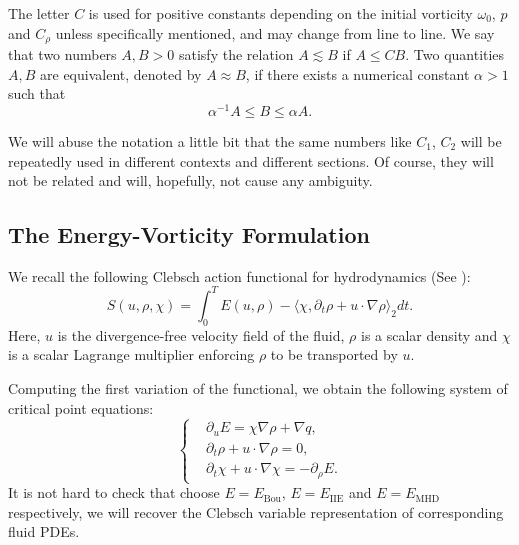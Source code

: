 \documentclass[12pt,letterpaper]{article}
\theoremstyle{plain}
\begin{document}
The letter $C$ is used for positive constants depending on the initial vorticity $\omega_0$, $p$ and $C_\rho$ unless specifically mentioned, and may change from line to line. We say that two numbers $A,B>0$ satisfy the relation $A\lesssim B$ if $A\le CB$. Two quantities $A,B$ are equivalent, denoted by $A\approx B$, if there exists a numerical constant $\alpha>1$ such that
\begin{equation*}
 \alpha^{-1}A\le B\le \alpha A.  
\end{equation*}

We will abuse the notation a little bit that the same numbers like $C_1$, $C_2$ will be repeatedly used in different contexts and different sections. Of course, they will not be related and will, hopefully, not cause any ambiguity.


\subsection{The Energy-Vorticity Formulation}


We recall the following Clebsch action functional for hydrodynamics (See \cite{HMR98}\cite{HSS09}):
\begin{equation*}
S(u,\rho,\chi)=\int_0^T E(u,\rho)-\langle \chi,\partial_t\rho+u\cdot\nabla\rho\rangle_2 dt  .  \end{equation*}
Here, $u$ is the divergence-free velocity field of the fluid, $\rho$ is a scalar density and $\chi$ is a scalar Lagrange multiplier enforcing $\rho$ to be transported by $u$.

Computing the first variation of the functional, we obtain the following system of critical point equations:
\begin{equation}\label{Critical Point of Clebsch}
\left\{
\begin{aligned}
&\partial_u E=\chi\nabla\rho+\nabla q,\\
&\partial_t \rho+u\cdot\nabla\rho=0,\\
& \partial_t \chi+u\cdot\nabla\chi=-\partial_\rho E.
\end{aligned}
\right.
\end{equation}
It is not hard to check that choose $E=E_{\text{Bou}}$, $E=E_{\text{IIE}}$ and $E=E_{\text{MHD}}$ respectively, we will recover the Clebsch variable representation of corresponding fluid PDEs.
\end{document}
